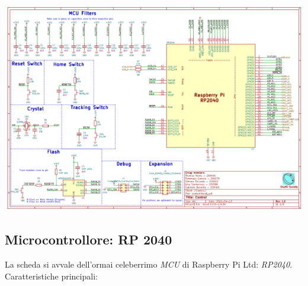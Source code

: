 \begin{center}
\includegraphics[scale=0.5]{figures/image40.png}
\captionsetup{type=figure}
\end{center}

\hypertarget{microcontrollore-rp-2040}{%
\subsection{\texorpdfstring{Microcontrollore: RP
2040}{ Microcontrollore: RP 2040}}\label{microcontrollore-rp-2040}}

La scheda si avvale dell'ormai celeberrimo \emph{MCU} di Raspberry Pi Ltd: \emph{RP2040}.\\
Caratteristiche principali:

